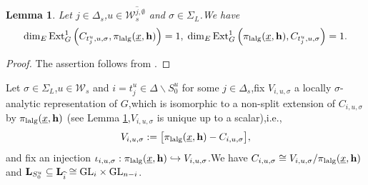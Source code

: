 \documentclass[10pt]{article}
\newtheorem{lem}[thm]{Lemma}
\newcommand{\ext}{{\rm Ext}}
\newcommand{\GLN}{{\rm GL}}
\newcommand{\lalg}{{\rm lalg}}
\newcommand{\bL}{{\mathbf{L}}}
\newcommand{\bh}{{\mathbf{h}}}
\newcommand{\sW}{\mathscr W}
\begin{document}
\begin{lem}\label{parameterlineextgp}
	Let $j\in \Delta_s$,\;$u\in \sW_{s}^{\widehat{j},\emptyset}$ and $\sigma\in \Sigma_L$.\;We have 
	\begin{equation}
		\begin{aligned}
			\dim_E\ext^1_G\left(C_{t^u_j,u,\sigma},\pi_{\lalg}(\underline{x},\bh)\right)=1,\;
			\dim_E\ext^1_G\left(\pi_{\lalg}(\underline{x},\bh),C_{t^u_j,u,\sigma}\right)=1.
		\end{aligned}
	\end{equation}
\end{lem}
\begin{proof}The assertion follows from \cite[Proposition 5.1.14]{BQ24}.\;
\end{proof}

Let $\sigma\in \Sigma_L$,\;$u\in \sW_s$ and  $i=t^u_j\in \Delta\backslash S_0^u$ for some $j\in \Delta_s$,\;fix $V_{i,u,\sigma}$ a locally $\sigma$-analytic representation of $G$,\;which is isomorphic to a non-split extension of $C_{i,u,\sigma}$ by $\pi_{\lalg}(\underline{x},\bh)$ (see Lemma \ref{parameterlineextgp},\;$V_{i,u,\sigma}$ is unique up to a scalar),\;i.e.,\;
\[V_{i,u,\sigma}:=\big[\pi_{\lalg}(\underline{x},\bh)-C_{i,u,\sigma}\big],\]
and fix an injection $\iota_{i,u,\sigma}:\pi_{\lalg}(\underline{x},\bh)\hookrightarrow V_{i,u,\sigma}$.\;We have   $C_{i,u,\sigma}\cong V_{i,u,\sigma}/\pi_{\lalg}(\underline{x},\bh)$ and  $\bL_{S^u_0}\subseteq \bL_{\widehat{i}}\cong \GLN_i\times\GLN_{n-i}$.\;
\end{document}
